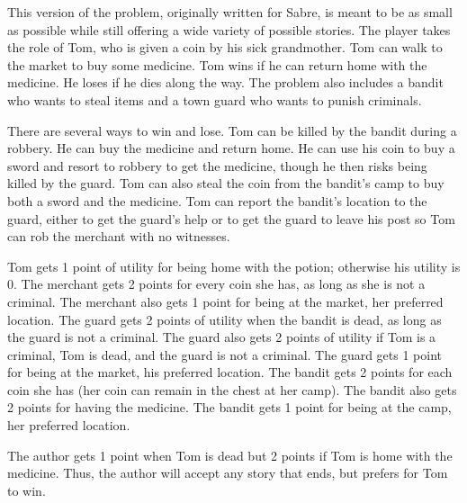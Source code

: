 \documentclass{nilreport}
\makeatletter
\renewcommand{\bibentry}[1]{\nocite{#1}{\frenchspacing\@nameuse{BR@r@#1\@extra@b@citeb}}}
\makeatother
\begin{document}
\begin{quote}
	\bibentry{ware2022multi}
\end{quote}

\noindent This version of the problem, originally written for Sabre,
is meant to be as small as possible while still offering a wide variety
of possible stories. The player takes the role of Tom, who is given
a coin by his sick grandmother. Tom can walk to the market to buy
some medicine. Tom wins if he can return home with the medicine. He
loses if he dies along the way. The problem also includes a bandit
who wants to steal items and a town guard who wants to punish criminals.

There are several ways to win and lose. Tom can be killed by the bandit
during a robbery. He can buy the medicine and return home. He can
use his coin to buy a sword and resort to robbery to get the medicine,
though he then risks being killed by the guard. Tom can also steal
the coin from the bandit's camp to buy both a sword and the medicine.
Tom can report the bandit's location to the guard, either to get the
guard's help or to get the guard to leave his post so Tom can rob
the merchant with no witnesses.

Tom gets 1 point of utility for being home with the potion; otherwise
his utility is 0. The merchant gets 2 points for every coin she has,
as long as she is not a criminal. The merchant also gets 1 point for
being at the market, her preferred location. The guard gets 2 points
of utility when the bandit is dead, as long as the guard is not a
criminal. The guard also gets 2 points of utility if Tom is a criminal,
Tom is dead, and the guard is not a criminal. The guard gets 1 point
for being at the market, his preferred location. The bandit gets 2
points for each coin she has (her coin can remain in the chest at
her camp). The bandit also gets 2 points for having the medicine.
The bandit gets 1 point for being at the camp, her preferred location.

The author gets 1 point when Tom is dead but 2 points if Tom is home
with the medicine. Thus, the author will accept any story that ends,
but prefers for Tom to win.

\medskip{}
\noindent{}
\end{document}
